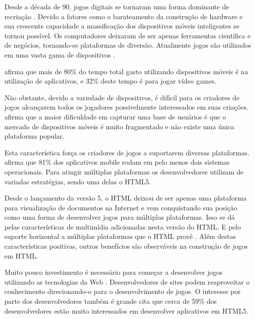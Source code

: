 
Desde a década de 90, jogos digitais se tornaram uma forma dominante
de recriação \autocite{gameDesignPatterns}. Devido a fatores como o
barateamento da construção de hardware e sua crescente capacidade a massificação
dos dispositivos móveis inteligentes se tornou possível. Os
computadores deixaram de ser apenas ferramentas científica e de
negócios, tornando-se plataformas de diversão. Atualmente jogos
são utilizados em uma vasta gama de dispositivos \autocite[p.
6]{crossPlatformMobileGameDevelopment}.

\citet{HTML5CrossPlatformGameDevelopment} afirma que mais de 80\% do
tempo total gasto utilizando dispositivos móveis é na utilização de
aplicativos, e 32\% deste tempo é para jogar vídeo games.

Não obstante, devido a variedade de dispositivos, é difícil para
os criadores de jogos alcançarem todos os jogadores possivelmente
interessados em suas criações. \citet{html5Tradeoffs} afirma que a
maior dificuldade em capturar uma base de usuários é que o mercado
de dispositivos móveis é muito fragmentado e não existe uma única
plataforma popular.

Esta característica força os criadores de jogos a suportarem diversas
plataformas. \autocite{htmlSurvey} afirma que 81\% dos aplicativos
mobile rodam em pelo menos dois sistemas operacionais. Para atingir
múltiplas plataformas os desenvolvedores utilizam de variadas
estratégias, sendo uma delas o HTML5.

Desde o lançamento da versão 5, o HTML deixou de ser apenas uma
plataforma para visualização de documentos na Internet e vem
conquistando sua posição como uma forma de desenvolver jogos
para múltiplas plataformas. Isso se dá pelas características de
multimídia adicionadas nesta versão do HTML. E pelo suporte horizontal
a múltiplas plataformas que o HTML provê \autocite{html5Tradeoffs}.
Além destas características positivas, outros benefícios são
observáveis na construção de jogos em HTML.

Muito pouco investimento é necessário para começar a desenvolver
jogos utilizando as tecnologias da Web \autocite{html5mostwanted}.
Desenvolvedores de sites podem reaproveitar o conhecimento direcionando-o
para o desenvolvimento de jogos. O interesse por parte dos
desenvolvedores também é grande \autocite{htmlSurvey} cita que cerca
de 59\% dos desenvolvedores estão muito interessados em desenvolver
aplicativos em HTML5.

